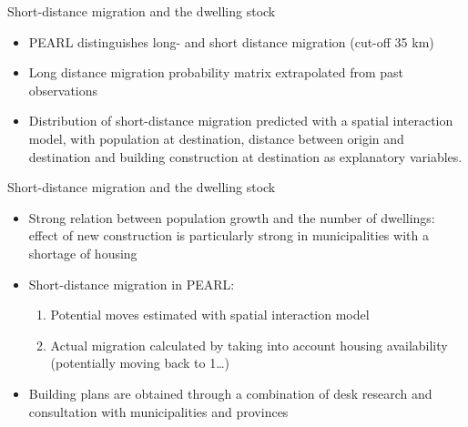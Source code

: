 \documentclass[final, 12pt, aspectratio=169, xcolor={dvipsnames}]{beamer}
\newcommand*{\figs}{../figs}%
\begin{document}
\begin{frame}{Immigration and emigration}
  \noindent
  \begin{minipage}[t]{0.48\linewidth}%
    \begin{figure}
    \texttt{[image: \\figs/\{immigration\_2016\_P2019.png]}}
  \end{figure}

\end{minipage}%
\hfill%
\begin{minipage}[t]{0.48\linewidth}
  \begin{figure}
    \texttt{[image: \\figs/\{emigration\_2016\_P2019.png]}}
  \end{figure}
\end{minipage}
  
  \end{frame}

\begin{frame}{Short-distance migration and the dwelling stock}
\begin{itemize}
    \item PEARL distinguishes long- and short distance migration (cut-off 35 km)
      \item Long distance migration probability matrix extrapolated from past observations
      \item Distribution of short-distance migration predicted with a spatial interaction model, with population at destination, distance between origin and destination and building construction at destination as explanatory variables.
      \end{itemize}
\end{frame}

\begin{frame}{Short-distance migration and the dwelling stock}
  \begin{itemize}
  \item Strong relation between population growth and the number of dwellings: effect of new construction is particularly strong in municipalities with a shortage of housing
  \item Short-distance migration in PEARL:
    \begin{enumerate}
    \item Potential moves estimated with spatial interaction model
    \item Actual migration calculated by taking into account housing availability (potentially moving back to 1…)
    \end{enumerate}
  \item Building plans are obtained through a combination of desk research and consultation with municipalities and provinces
  \end{itemize}
  \href{http://www.pbl.nl/publicaties/pbl-cbs-regionale-bevolkings-en-huishoudensprognose-2016-2040-woningbouwveronderstellingen}{}
\end{frame}
\end{document}
